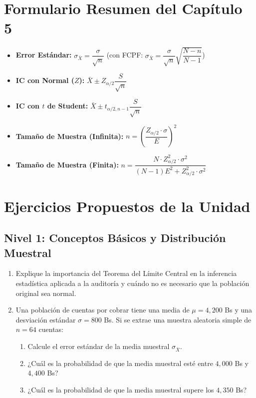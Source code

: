 \section{Formulario Resumen del Capítulo 5}
\begin{formulario}
\begin{itemize}
    \item \textbf{Error Estándar:} $\sigma_{\bar{X}} = \dfrac{\sigma}{\sqrt{n}}$ \quad (con FCPF: $\sigma_{\bar{X}} = \dfrac{\sigma}{\sqrt{n}} \sqrt{\dfrac{N-n}{N-1}}$)
    \item \textbf{IC con Normal ($Z$):} $\bar{X} \pm Z_{\alpha/2} \dfrac{S}{\sqrt{n}}$
    \item \textbf{IC con $t$ de Student:} $\bar{X} \pm t_{\alpha/2, n-1} \dfrac{S}{\sqrt{n}}$
    \item \textbf{Tamaño de Muestra (Infinita):} $n = \left( \dfrac{Z_{\alpha/2} \cdot \sigma}{E} \right)^2$
    \item \textbf{Tamaño de Muestra (Finita):} $n = \dfrac{N \cdot Z_{\alpha/2}^2 \cdot \sigma^2}{(N-1)E^2 + Z_{\alpha/2}^2 \cdot \sigma^2}$
\end{itemize}
\end{formulario}

\section{Ejercicios Propuestos de la Unidad}

\subsection*{Nivel 1: Conceptos Básicos y Distribución Muestral}
\begin{enumerate}
    \item Explique la importancia del Teorema del Límite Central en la inferencia estadística aplicada a la auditoría y cuándo no es necesario que la población original sea normal.
    \item Una población de cuentas por cobrar tiene una media de $\mu = 4{,}200$ Bs y una desviación estándar $\sigma = 800$ Bs. Si se extrae una muestra aleatoria simple de $n = 64$ cuentas:
    \begin{enumerate}[label=\alph*)]
        \item Calcule el error estándar de la media muestral $\sigma_{\bar{X}}$.
        \item ¿Cuál es la probabilidad de que la media muestral esté entre $4{,}000$ Bs y $4{,}400$ Bs?
        \item ¿Cuál es la probabilidad de que la media muestral supere los $4{,}350$ Bs?
    \end{enumerate}
\end{enumerate}

